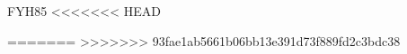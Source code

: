 \documentclass{compositio}
\theoremstyle{definition}
\numberwithin{equation}{section}
\begin{document}
\begin{thebibliography}{FYH{\etalchar{+}}85}
%
%
%
%
%
%
%
%
%
<<<<<<< HEAD

\end{thebibliography}
=======
%
>>>>>>> 93fae1ab5661b06bb13e391d73f889fd2c3bdc38
\end{document}
